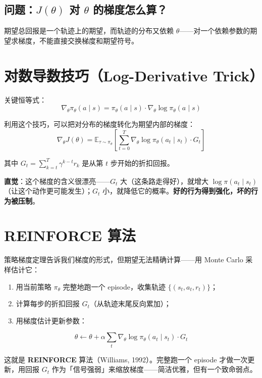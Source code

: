 \documentclass{article}
\begin{document}
\subsection*{问题：$J(\theta)$ 对 $\theta$ 的梯度怎么算？}

期望总回报是一个轨迹上的期望，而轨迹的分布又依赖 $\theta$——对一个依赖参数的期望求梯度，不能直接交换梯度和期望符号。

\section*{对数导数技巧（Log-Derivative Trick）}

关键恒等式：
\[
\nabla_\theta \pi_\theta(a \mid s) = \pi_\theta(a \mid s) \cdot \nabla_\theta \log \pi_\theta(a \mid s)
\]

利用这个技巧，可以把对分布的梯度转化为期望内部的梯度：
\[
\boxed{\nabla_\theta J(\theta) = \mathbb{E}_{\tau \sim \pi_\theta}\!\left[\sum_{t=0}^{T} \nabla_\theta \log \pi_\theta(a_t \mid s_t) \cdot G_t \right]}
\]

其中 $G_t = \sum_{k=t}^{T} \gamma^{k-t} r_k$ 是从第 $t$ 步开始的折扣回报。

\textbf{直觉}：这个梯度的含义很漂亮——$G_t$ 大（这条路走得好），就增大 $\log \pi(a_t \mid s_t)$（让这个动作更可能发生）；$G_t$ 小，就降低它的概率。\textbf{好的行为得到强化，坏的行为被压制}。

\section*{REINFORCE 算法}

策略梯度定理告诉我们梯度的形式，但期望无法精确计算——用 Monte Carlo 采样估计它：

\begin{enumerate}
  \item 用当前策略 $\pi_\theta$ 完整地跑一个 episode，收集轨迹 $\{(s_t, a_t, r_t)\}$；
  \item 计算每步的折扣回报 $G_t$（从轨迹末尾反向累加）；
  \item 用梯度估计更新参数：
\end{enumerate}
\[
\boxed{\theta \leftarrow \theta + \alpha \sum_{t} \nabla_\theta \log \pi_\theta(a_t \mid s_t) \cdot G_t}
\]

这就是 \textbf{REINFORCE} 算法（Williams, 1992）。完整跑一个 episode 才做一次更新，用回报 $G_t$ 作为「信号强弱」来缩放梯度——简洁优雅，但有一个致命弱点。
\end{document}
